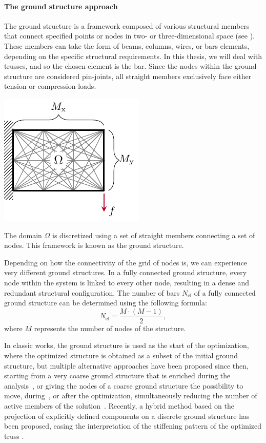 \paragraph{The ground structure approach}
The ground structure is a framework composed of various structural members that connect specified points or nodes in two- or three-dimensional space (see ). These members can take the form of beams, columns, wires, or bars elements, depending on the specific structural requirements. In this thesis, we will deal with trusses, and so the chosen element is the bar. Since the nodes within the ground structure are considered pin-joints, all straight members exclusively face either tension or compression loads. 
\begin{marginfigure}
    \centering
    \includegraphics{figures/02_literature/04_disc_mesh/d_mesh.pdf}
    \caption{The domain $\Omega$ is discretized using a set of straight members connecting a set of nodes. This framework is known as the ground structure.}
    \label{fig:02_mesh_d}
\end{marginfigure}

Depending on how the connectivity of the grid of nodes is, we can experience very different ground structures. In a fully connected ground structure, every node within the system is linked to every other node, resulting in a dense and redundant structural configuration. The number of bars $N_{\text{el}}$ of a fully connected ground structure can be determined using the following formula:
\begin{equation}
    N_{\text{el}} = \frac{M \cdot (M-1)}{2},
\end{equation}
where $M$ represents the number of nodes of the structure.

In classic works, the ground structure is used as the start of the optimization, where the optimized structure is obtained as a subset of the initial ground structure, but multiple alternative approaches have been proposed since then, \eg starting from a very coarse ground structure that is enriched during the analysis~, or giving the nodes of a coarse ground structure the possibility to move, during~, or after the optimization, simultaneously reducing the number of active members of the solution~. Recently, a hybrid method based on the projection of explicitly defined components on a discrete ground structure has been proposed, easing the interpretation of the stiffening pattern of the optimized truss .

